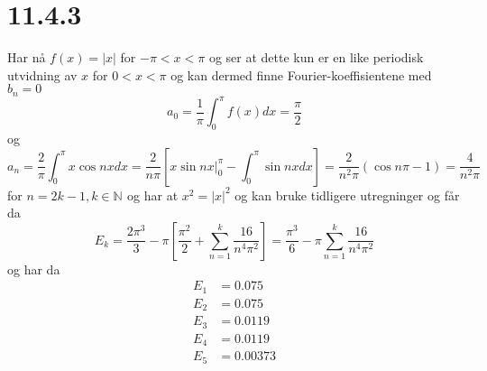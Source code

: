 \documentclass{report}
\newcommand{\M}[2]{\mathbb{#1}^{#2}}
\newcommand{\nbrack}[1]{\left( #1 \right)}
\newcommand{\bbrack}[1]{\left[ #1 \right]}
\begin{document}
\section*{11.4.3}
Har nå $f(x) = |x|$ for $-\pi < x < \pi$ og ser at dette kun er en like periodisk utvidning av $x$ for $0 < x < \pi$ og kan dermed finne Fourier-koeffisientene med $b_{n} = 0$
\begin{equation}
  \label{eq:9}
  a_{0} = \frac{1}{\pi} \int_{0}^{\pi} f(x) dx = \frac{\pi}{2}
\end{equation}
og
\begin{equation}
  \label{eq:10}
  a_{n} = \frac{2}{\pi} \int_{0}^{\pi} x \cos nx dx = \frac{2}{n\pi} \bbrack{ x\sin nx \Big|_{0}^{\pi} - \int_{0}^{\pi} \sin nx dx } = \frac{2}{n^{2} \pi} \nbrack{ \cos n\pi - 1 } = \frac{4}{n^{2}\pi}
\end{equation}
for $n = 2k-1, k\in\M{N}{}$ og har at $x^{2} = |x|^{2}$ og kan bruke tidligere utregninger og får da
\begin{equation}
  \label{eq:12}
  E_{k} = \frac{2\pi^{3}}{3} -  \pi \bbrack{ \frac{\pi^{2}}{2} + \sum_{n=1}^{k} \frac{16}{n^{4}\pi^{2}}}
  = \frac{\pi^{3}}{6} - \pi \sum_{n=1}^{k} \frac{16}{n^{4}\pi^{2}}
\end{equation}
og har da
\begin{equation}
  \label{eq:13}
  \begin{split}
    E_{1} &= 0.075\\
    E_{2} &= 0.075 \\
    E_{3} &= 0.0119\\
    E_{4} &= 0.0119\\
    E_{5} &= 0.00373\\
  \end{split}
\end{equation}
\end{document}

